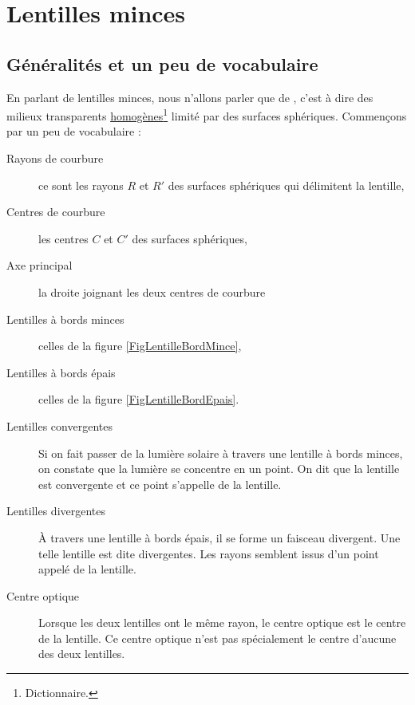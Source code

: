 

%
   \section{Lentilles minces}			\label{SecLentMinces}
%

\subsection{Généralités et un peu de vocabulaire}

En parlant de lentilles minces, nous n'allons parler que de , c'est à dire des milieux transparents \href{http://fr.wikipedia.org/wiki/Homogène}{homogènes}\footnote{Dictionnaire.} limité par des surfaces sphériques. Commençons par un peu de vocabulaire :
\begin{description}
\item[Rayons de courbure] ce sont les rayons $R$ et $R'$ des surfaces sphériques qui délimitent la lentille,
\item[Centres de courbure] les centres $C$ et $C'$ des surfaces sphériques,
\item[Axe principal] la droite joignant les deux centres de courbure
\item[Lentilles à bords minces] celles de la figure \ref{FigLentilleBordMince},
\item[Lentilles à bords épais] celles de la figure \ref{FigLentilleBordEpais}.
\item[Lentilles convergentes]  Si on fait passer de la lumière solaire à travers une lentille à bords minces, on constate que la lumière se concentre en un point. On dit que la lentille est convergente et ce point s'appelle  de la lentille.
\item[Lentilles divergentes] À travers une lentille à bords épais, il se forme un faisceau divergent. Une telle lentille est dite divergentes. Les rayons semblent issus d'un point appelé  de la lentille.
\item[Centre optique] Lorsque les deux lentilles ont le même rayon, le centre optique est le centre de la lentille. Ce centre optique n'est pas spécialement le centre d'aucune des deux lentilles.
\end{description}

